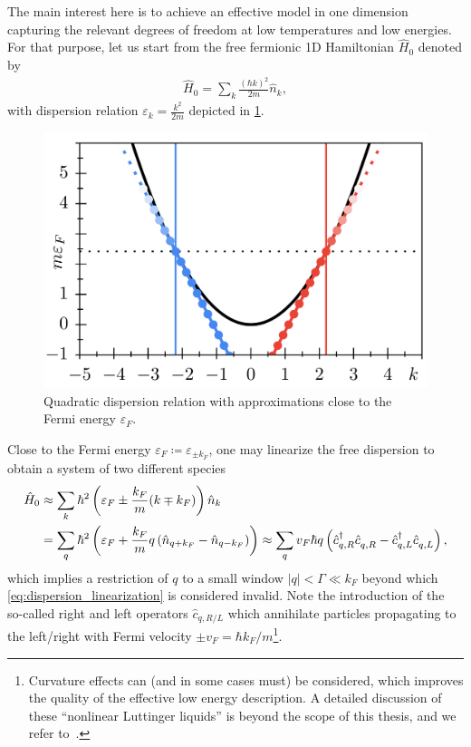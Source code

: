 The main interest here is to achieve an effective model in one dimension capturing the relevant degrees of freedom at low temperatures and low energies.
For that purpose, let us start from the free fermionic 1D Hamiltonian $\hat H_0$ denoted by
\begin{align}
    \hat H_0 = \sum_k \frac{(\hbar k)^2}{2m}\hat n_k,
    \label{eq:hamiltonian_free_particles}
\end{align}
with dispersion relation $\varepsilon_k =\frac{k^2}{2m}$ depicted in \cref{fig:1D_quadratic_dispersion}.
\begin{figure}
    \centering
    \includegraphics{figures/1D_quadratic_dispersion.png}
    \caption{Quadratic dispersion relation with approximations close to the Fermi energy $\varepsilon_F$.}
    \label{fig:1D_quadratic_dispersion}
\end{figure}
Close to the Fermi energy $\varepsilon_F\coloneqq\varepsilon_{\pm k_F}$, one may linearize the free dispersion to obtain a system of two different species
\begin{align}
    \hat H_0
    &\approx \sum_k \hbar^2\brlr{\varepsilon_F \pm \frac{k_F}{m}(k\mp k_F)}\hat n_k
    \\
    &= \sum_q \hbar^2\brlr{\varepsilon_F + \frac{k_F}{m}q\brlr{\hat n_{q+k_F}-\hat n_{q-k_F}}}
    \approx \sum_{q} v_F \hbar q \brlr{\hat c^\dag_{q,R}\hat c^\pdag_{q,R} - \hat c^\dag_{q,L}\hat c^\pdag_{q,L}},
    \label{eq:dispersion_linearization}
\end{align}
which implies a restriction of $q$ to a small window $|q|<\Gamma\ll k_F$ beyond which \cref{eq:dispersion_linearization} is considered invalid.
Note the introduction of the so-called right and left operators $\hat c_{q,R/L}$ which annihilate particles propagating to the left/right with Fermi velocity $\pm v_F=\hbar k_F/m$\footnote{Curvature effects can (and in some cases must) be considered, which improves the quality of the effective low energy description. A detailed discussion of these ``nonlinear Luttinger liquids'' is beyond the scope of this thesis, and we refer to~\cite{Imambekov2009}.}.

